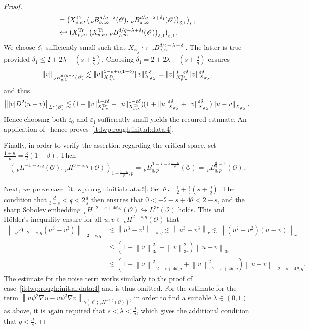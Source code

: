 \documentclass[reqno]{amsart}
\newcommand{\sO}{\mathscr{O}}
\newcommand{\ce}{\coloneqq}
\newcommand{\1}{\mathbf{1}}
\newcommand{\nH}{\ensuremath{\,_\nu H}}
\newcommand{\bpsn}[1]{\ensuremath{\nH^{#1}(\sO)}}
\newcommand{\nrm}[1]{\left\lVert #1 \right\rVert}
\begin{document}
\begin{proof}
\[\begin{aligned}
                &=\big( X_{p,\kappa}^{\textup{Tr}}, \big(\,_\nu B_{q,\infty}^{d/q-\lambda}(\sO), \,_\nu B_{q,\infty}^{d/q-\lambda+\delta_1}(\sO)\big)_{\delta,1}\big)_{\varepsilon,1}\\
                &\hookleftarrow \big(X_{p,\kappa}^{\textup{Tr}}, \big( X_{p,\kappa}^{\textup{Tr}}, \,_\nu B_{q,\infty}^{d/q-\lambda+\delta_1}(\sO)\big)_{\delta,1}\big)_{\varepsilon,1}.
            \end{aligned}\]
            We choose $\delta_1$ sufficiently small such that $X_{\varphi_\lambda}\hookrightarrow\,_\nu B_{q,\infty}^{d/q-\lambda+\delta_1} $. The latter is true provided $\delta_1\le  2+2\lambda-(s+\frac{d}{q})$. Choosing $\delta_1= 2+2\lambda-(s+\frac{d}{q})$ ensures 
            \[\|v\|_{\,_\nu B_{q,1}^{d/q-\lambda}(\sO)}\lesssim \| v\|_{X_{p,\kappa}^{\textup{Tr}}}^{1-\varepsilon+\varepsilon(1-\delta)}\|v\|_{X_{\varphi_\lambda}}^{\varepsilon\cdot \delta}=\|v\|_{X_{p,\kappa}^{\textup{Tr}}}^{1-\varepsilon\delta} \|v\|_{X_{\varphi_\lambda}}^{\varepsilon\delta},\]
            and thus
            \[\nrm{|v|D^2(u-v)}_{L^r(\sO)} \lesssim (1+\nrm{v}_{X_{p,\kappa}^{\textup{Tr}}}^{1-\varepsilon\delta}+\nrm{u}_{X_{p,\kappa}^{\textup{Tr}}}^{1-\varepsilon\delta})(1+\nrm{u}_{X_{\varphi_\lambda}}^{\varepsilon\delta}+\nrm{v}_{X_{\varphi_\lambda}}^{\varepsilon\delta})\nrm{u-v}_{X_{\varphi_\lambda}}.\]
            Hence choosing both $\varepsilon_0$ and $\varepsilon_1$ sufficiently small yields the required estimate. 
            An application of~\cite[Theorem 4.3]{agrestiNonlinearParabolicStochastic2022a} hence proves~\ref{it:lwp:rough:initial:data:4}.

        Finally, in order to verify the assertion regarding the critical space, set $\frac{1+\kappa}{p}=\frac{3}{2}(1-\beta)$. Then 
        $$(\bpsn{-1-s,q},\bpsn{3-s,q})_{1-\frac{1+\kappa}{p},p}= \,_\nu B_{q,p}^{3-s-4\frac{1+\kappa}{p}}(\sO) =\,_\nu B_{q,p}^{\frac{d}{q}-1}(\sO).$$


Next, we prove case~\ref{it:lwp:rough:initial:data:2}. 
		Set $\theta\ce\frac{1}{2}+\frac{1}{6}(s+\frac{d}{q})$. The condition that $\frac{d}{3-s}<q<2\frac{d}{s}$ then ensures that $0<-2-s+4\theta<2-s$, and the sharp Sobolev embedding $\bpsn{-2-s+4\theta,q}\hookrightarrow L^{3r}(\sO)$ holds. 
		This and Hölder's inequality ensure for all $u,v\in \bpsn{2-s,q}$ that 
			\[\begin{aligned}
			\nrm{\,_\nu\Delta_{-2-s,q} (u^3-v^3)}_{-2-s,q} &\lesssim  \nrm{u^3-v^3}_{-s,q} \lesssim \nrm{u^3-v^3}_r\lesssim \nrm{(u^2+v^2)(u-v)}_r\\
			&\le (1+\nrm{u}_{3r}^2+\nrm{v}_{3r}^2)\nrm{u-v}_{3r}\\
			&\lesssim (1+\nrm{u}_{-2-s+4\theta,q}^2 + \nrm{v}_{-2-s+4\theta,q}^2) \nrm{u-v}_{-2-s+4\theta,q}.
		\end{aligned}\]
		The estimate for the noise term works similarly to the proof of case~\ref{it:lwp:rough:initial:data:4} and is thus omitted. For the estimate for the term $\nrm{u\psi^2 \nabla u- v\psi^2\nabla v}_{\gamma(\ell^2;\bpsn{-s,q})}$, in order to find a suitable $\lambda \in (0,1)$ as above, it is again required that $s<\lambda<\frac{d}{q}$, which gives the additional condition that $q<\frac{d}{s}$. 
        

\end{proof}
\end{document}
